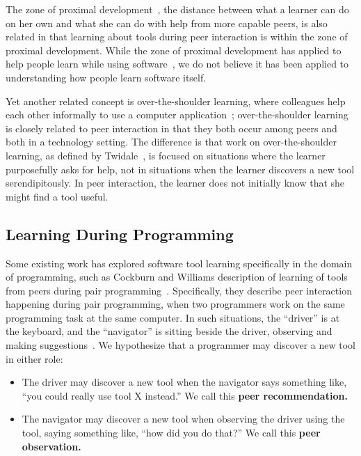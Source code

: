 \documentclass[smallextended]{svjour3}
\newcommand\discovery{peer interaction\xspace}
\newcommand\discpush{peer recommendation\xspace}
\newcommand\discpull{peer observation\xspace}
\begin{document}
The zone of proximal development~\cite{vygotsky}, the distance between
what a learner can do on her own and what she can do with help from
more capable peers, is also related in that learning about tools during
\discovery is within the zone of proximal development.
While the zone of proximal development has applied to help people learn
while using software~\cite{borthick,crook,luckin},
we do not believe it has been applied to understanding how people
learn software itself.


Yet another related concept is over-the-shoulder learning, where colleagues help
each other informally to use a computer application~\cite{twidale05}; 
over-the-shoulder learning is closely related to \discovery in that
they both occur among peers and both in a technology setting.
The difference is that work on over-the-shoulder learning, as 
defined by Twidale~\cite{twidale05}, is focused on situations where the learner purposefully asks for help,
not in situations when the learner discovers a new tool serendipitously.
In \discovery, the learner does not initially know that she might find a tool
useful.

\subsection{Learning During Programming}

Some existing work has explored software tool learning specifically in the domain
of programming, such as Cockburn and Williams description
of learning of tools from peers during pair programming~\cite{cockburn00}.
Specifically, they describe \discovery happening during pair programming, 
when two programmers work on the same programming task at the same computer.
In such situations, the ``driver'' is at the keyboard, and the ``navigator'' is
sitting beside the driver, observing and making suggestions~\cite{cockburn00}.
We hypothesize that a programmer may discover a new tool in either role:
\begin{itemize}
\item
The driver may discover a new tool when the navigator says 
something like, ``you could really use tool X instead.'' 
We call this \textbf{\discpush.}
\item
The navigator may discover a new tool when observing the driver using the tool,
saying something like, ``how did you do that?'' 
We call this \textbf{\discpull.}
\end{itemize}
\end{document}
